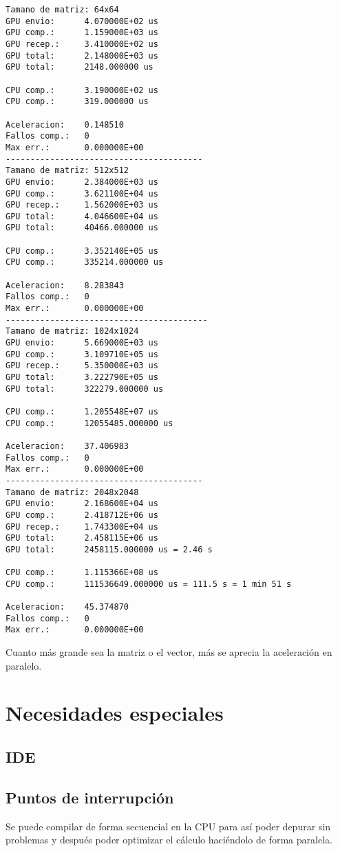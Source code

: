 \documentclass[12pt,a4paper]{article}
\begin{document}
\begin{lstlisting}
Tamano de matriz: 64x64
GPU envio:      4.070000E+02 us
GPU comp.:      1.159000E+03 us
GPU recep.:     3.410000E+02 us
GPU total:      2.148000E+03 us
GPU total:      2148.000000 us

CPU comp.:      3.190000E+02 us
CPU comp.:      319.000000 us

Aceleracion:    0.148510
Fallos comp.:   0
Max err.:       0.000000E+00
----------------------------------------
Tamano de matriz: 512x512
GPU envio:      2.384000E+03 us
GPU comp.:      3.621100E+04 us
GPU recep.:     1.562000E+03 us
GPU total:      4.046600E+04 us
GPU total:      40466.000000 us

CPU comp.:      3.352140E+05 us
CPU comp.:      335214.000000 us

Aceleracion:    8.283843
Fallos comp.:   0
Max err.:       0.000000E+00
-----------------------------------------
Tamano de matriz: 1024x1024
GPU envio:      5.669000E+03 us
GPU comp.:      3.109710E+05 us
GPU recep.:     5.350000E+03 us
GPU total:      3.222790E+05 us
GPU total:      322279.000000 us

CPU comp.:      1.205548E+07 us
CPU comp.:      12055485.000000 us

Aceleracion:    37.406983
Fallos comp.:   0
Max err.:       0.000000E+00
----------------------------------------
Tamano de matriz: 2048x2048
GPU envio:      2.168600E+04 us
GPU comp.:      2.418712E+06 us
GPU recep.:     1.743300E+04 us
GPU total:      2.458115E+06 us
GPU total:      2458115.000000 us = 2.46 s

CPU comp.:      1.115366E+08 us
CPU comp.:      111536649.000000 us = 111.5 s = 1 min 51 s

Aceleracion:    45.374870
Fallos comp.:   0
Max err.:       0.000000E+00
\end{lstlisting}

Cuanto más grande sea la matriz o el vector, más se aprecia la aceleración en
paralelo.
\section{Necesidades especiales}
\subsection{IDE}
\subsection{Puntos de interrupción}
Se puede compilar de forma secuencial en la CPU para así poder depurar sin
problemas y después poder optimizar el cálculo haciéndolo de forma paralela.
\end{document}
